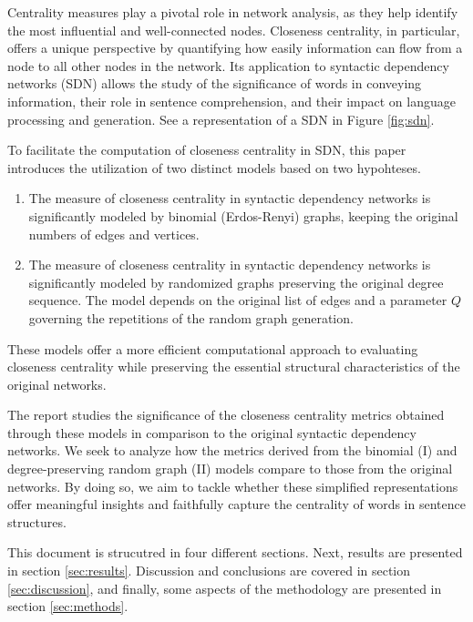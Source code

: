 Centrality measures play a pivotal role in network analysis, as they help identify the most influential and well-connected nodes. Closeness centrality, in particular, offers a unique perspective by quantifying how easily information can flow from a node to all other nodes in the network. Its application to syntactic dependency networks (SDN) allows the study of the significance of words in conveying information, their role in sentence comprehension, and their impact on language processing and generation. See a representation of a SDN in Figure \ref{fig:sdn}.

To facilitate the computation of closeness centrality in SDN, this paper introduces the utilization of two distinct models based on two hypohteses. 
\begin{enumerate}[I]
    \item The measure of closeness centrality in syntactic dependency networks is significantly modeled by binomial (Erdos-Renyi) graphs, keeping the original numbers of edges and vertices.
    \item The measure of closeness centrality in syntactic dependency networks is significantly modeled by randomized graphs preserving the original degree sequence. The model depends on the original list of edges and a parameter $Q$ governing the repetitions of the random graph generation.
\end{enumerate}

These models offer a more efficient computational approach to evaluating closeness centrality while preserving the essential structural characteristics of the original networks.

The report studies the significance of the closeness centrality metrics obtained through these models in comparison to the original syntactic dependency networks. We seek to analyze how the metrics derived from the binomial (I) and degree-preserving random graph (II) models compare to those from the original networks. By doing so, we aim to tackle whether these simplified representations offer meaningful insights and faithfully capture the centrality of words in sentence structures.

This document is strucutred in four different sections. Next, results are presented in section \ref{sec:results}. Discussion and conclusions are covered in section \ref{sec:discussion}, and finally, some aspects of the methodology are presented in section \ref{sec:methods}.

